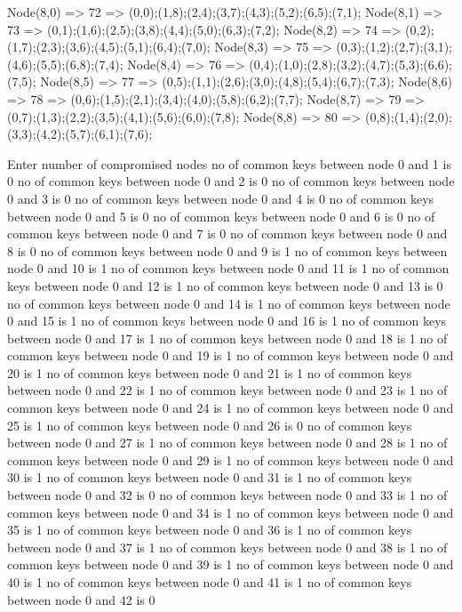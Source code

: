 Node(8,0) => 72 => (0,0);(1,8);(2,4);(3,7);(4,3);(5,2);(6,5);(7,1);
Node(8,1) => 73 => (0,1);(1,6);(2,5);(3,8);(4,4);(5,0);(6,3);(7,2);
Node(8,2) => 74 => (0,2);(1,7);(2,3);(3,6);(4,5);(5,1);(6,4);(7,0);
Node(8,3) => 75 => (0,3);(1,2);(2,7);(3,1);(4,6);(5,5);(6,8);(7,4);
Node(8,4) => 76 => (0,4);(1,0);(2,8);(3,2);(4,7);(5,3);(6,6);(7,5);
Node(8,5) => 77 => (0,5);(1,1);(2,6);(3,0);(4,8);(5,4);(6,7);(7,3);
Node(8,6) => 78 => (0,6);(1,5);(2,1);(3,4);(4,0);(5,8);(6,2);(7,7);
Node(8,7) => 79 => (0,7);(1,3);(2,2);(3,5);(4,1);(5,6);(6,0);(7,8);
Node(8,8) => 80 => (0,8);(1,4);(2,0);(3,3);(4,2);(5,7);(6,1);(7,6);



Enter number of compromised nodes
no of common keys between node 0 and 1 is 0
no of common keys between node 0 and 2 is 0
no of common keys between node 0 and 3 is 0
no of common keys between node 0 and 4 is 0
no of common keys between node 0 and 5 is 0
no of common keys between node 0 and 6 is 0
no of common keys between node 0 and 7 is 0
no of common keys between node 0 and 8 is 0
no of common keys between node 0 and 9 is 1
no of common keys between node 0 and 10 is 1
no of common keys between node 0 and 11 is 1
no of common keys between node 0 and 12 is 1
no of common keys between node 0 and 13 is 0
no of common keys between node 0 and 14 is 1
no of common keys between node 0 and 15 is 1
no of common keys between node 0 and 16 is 1
no of common keys between node 0 and 17 is 1
no of common keys between node 0 and 18 is 1
no of common keys between node 0 and 19 is 1
no of common keys between node 0 and 20 is 1
no of common keys between node 0 and 21 is 1
no of common keys between node 0 and 22 is 1
no of common keys between node 0 and 23 is 1
no of common keys between node 0 and 24 is 1
no of common keys between node 0 and 25 is 1
no of common keys between node 0 and 26 is 0
no of common keys between node 0 and 27 is 1
no of common keys between node 0 and 28 is 1
no of common keys between node 0 and 29 is 1
no of common keys between node 0 and 30 is 1
no of common keys between node 0 and 31 is 1
no of common keys between node 0 and 32 is 0
no of common keys between node 0 and 33 is 1
no of common keys between node 0 and 34 is 1
no of common keys between node 0 and 35 is 1
no of common keys between node 0 and 36 is 1
no of common keys between node 0 and 37 is 1
no of common keys between node 0 and 38 is 1
no of common keys between node 0 and 39 is 1
no of common keys between node 0 and 40 is 1
no of common keys between node 0 and 41 is 1
no of common keys between node 0 and 42 is 0
